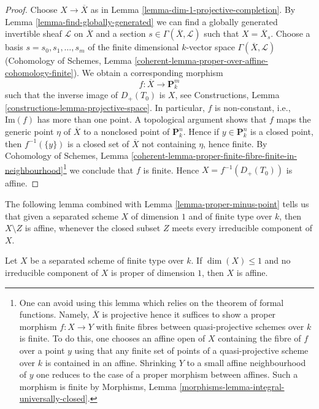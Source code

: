 \begin{proof}
Choose $X \to \overline{X}$ as in
Lemma \ref{lemma-dim-1-projective-completion}.
By Lemma \ref{lemma-find-globally-generated}
we can find a globally generated invertible sheaf $\mathcal{L}$
on $\overline{X}$ and a section $s \in \Gamma(\overline{X}, \mathcal{L})$
such that $X = \overline{X}_s$.
Choose a basis $s = s_0, s_1, \ldots, s_m$ of the finite dimensional
$k$-vector space $\Gamma(\overline{X}, \mathcal{L})$
(Cohomology of Schemes, Lemma
\ref{coherent-lemma-proper-over-affine-cohomology-finite}).
We obtain a corresponding morphism
$$
f : \overline{X} \longrightarrow \mathbf{P}^m_k
$$
such that the inverse image of $D_{+}(T_0)$ is $X$, see
Constructions, Lemma \ref{constructions-lemma-projective-space}.
In particular, $f$ is non-constant, i.e., $\text{Im}(f)$ has more
than one point. A topological argument shows that $f$ maps the generic
point $\eta$ of $\overline{X}$ to a nonclosed point of $\mathbf{P}^n_k$.
Hence if $y \in \mathbf{P}^n_k$ is a closed point, then $f^{-1}(\{y\})$
is a closed set of $\overline{X}$ not containing $\eta$, hence finite.
By Cohomology of Schemes, Lemma
\ref{coherent-lemma-proper-finite-fibre-finite-in-neighbourhood}\footnote{One
can avoid using this lemma which relies on the theorem of formal
functions. Namely, $\overline{X}$ is projective hence it suffices to show
a proper morphism $f : X \to Y$ with finite fibres between quasi-projective
schemes over $k$ is finite. To do this, one chooses an affine open of $X$
containing the fibre of $f$ over a point $y$ using that any finite set of
points of a quasi-projective scheme over $k$ is contained in an affine.
Shrinking $Y$ to a small affine neighbourhood of $y$ one reduces to the
case of a proper morphism between affines. Such a morphism is finite by
Morphisms, Lemma \ref{morphisms-lemma-integral-universally-closed}.}
we conclude that $f$ is finite. Hence $X = f^{-1}(D_{+}(T_0))$
is affine.
\end{proof}

\noindent
The following lemma combined with Lemma \ref{lemma-proper-minus-point}
tells us that given a separated scheme $X$ of dimension $1$ and
of finite type over $k$, then $X \setminus Z$ is affine, whenever the
closed subset $Z$ meets every irreducible component of $X$.

\begin{lemma}
\label{lemma-dim-1-nonproper-affine}
Let $X$ be a separated scheme of finite type over $k$.
If $\dim(X) \leq 1$ and no irreducible component of $X$
is proper of dimension $1$, then $X$ is affine.
\end{lemma}

